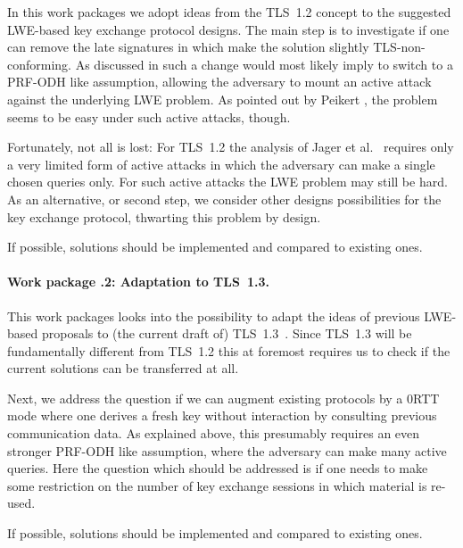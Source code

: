 In this work packages we adopt ideas from the TLS~1.2 concept \cite{TLS12} to the suggested LWE-based key exchange protocol designs. The main step is to investigate if one can remove the late signatures in \cite{BCNS15} which make the solution slightly TLS-non-conforming. As discussed in \cite{BCNS15} such a change would most likely imply to switch to a PRF-ODH like assumption, allowing the adversary to mount an active attack against the underlying LWE problem. As pointed out by Peikert \cite{P14}, the problem seems to be easy under such active attacks, though. 

Fortunately, not all is lost: For TLS~1.2 the analysis of Jager et al.~\cite{JKSS12} requires only a very limited form of active attacks in which the adversary can make a single chosen queries only. For such active attacks the LWE problem may still be hard. As an alternative, or second step, we consider other designs possibilities for the key exchange protocol, thwarting this problem by design.

If possible, solutions should be implemented and compared to existing ones.

\paragraph{Work package \theworkpackage.2: Adaptation to TLS~1.3.}

This work packages looks into the possibility to adapt the ideas of previous LWE-based proposals to (the current draft of) TLS~1.3~\cite{TLS13}. Since TLS~1.3 will be fundamentally different from TLS~1.2 this at foremost requires us to check if the current solutions can be transferred at all. 

Next, we address the question if we can augment existing protocols by a 0RTT mode where one derives a fresh key without interaction by consulting previous communication data. As explained above, this presumably requires an even stronger PRF-ODH like assumption, where the adversary can make many active queries. Here the question which should be addressed is if one needs to make some restriction on the number of key exchange sessions in which material is re-used.

If possible, solutions should be implemented and compared to existing ones.


